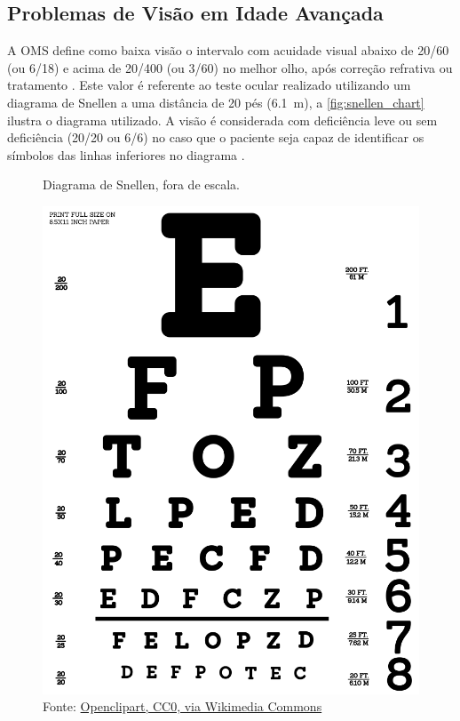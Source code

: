 
\subsection{Problemas de Visão em Idade Avançada}

A \ac{OMS} define como baixa visão o intervalo com acuidade visual abaixo de 20/60 (ou 6/18) e acima de 20/400 (ou 3/60) no melhor olho, após correção refrativa ou tratamento \cite{CBO2013condicoes}.
Este valor é referente ao teste ocular realizado utilizando um diagrama de Snellen a uma distância de 20 pés (\SI{6.1}{\metre}), a \autoref{fig:snellen_chart} ilustra o diagrama utilizado.
A visão é considerada com deficiência leve ou sem deficiência (20/20 ou 6/6) no caso que o paciente seja capaz de identificar os símbolos das linhas inferiores no diagrama \cite{lenscope2021}.

\begin{figure}[!htpb]
    \centering
    \caption{Diagrama de Snellen, fora de escala.}
    \label{fig:snellen_chart}
    \includegraphics[keepaspectratio, width=\linewidth, height=0.75\textheight]{../pictures/Snellen_chart.png}
    \caption*{Fonte: \href{https://commons.wikimedia.org/wiki/File:Snellen_chart_by_Openclipart.svg}{Openclipart, CC0, via Wikimedia Commons}}
\end{figure}

